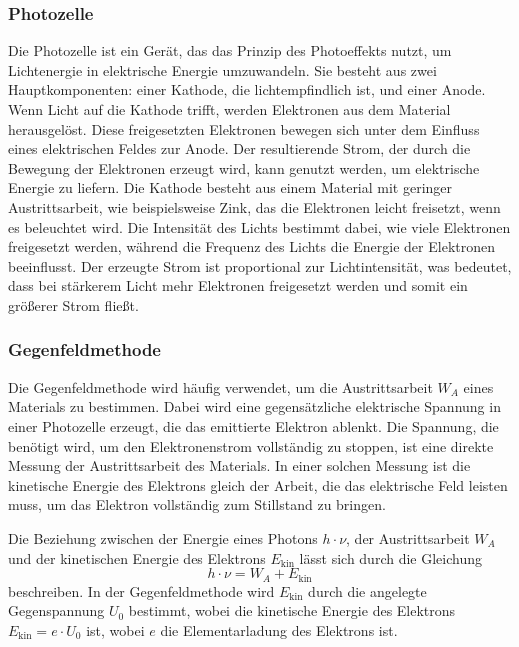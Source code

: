 \documentclass{article}
\begin{document}
    \subsubsection{Photozelle}
    Die Photozelle ist ein Gerät, das das Prinzip des Photoeffekts nutzt, um Lichtenergie in 
    elektrische Energie umzuwandeln. Sie besteht aus zwei Hauptkomponenten: einer Kathode, 
    die lichtempfindlich ist, und einer Anode. Wenn Licht auf die Kathode trifft, werden 
    Elektronen aus dem Material herausgelöst. Diese freigesetzten Elektronen bewegen sich 
    unter dem Einfluss eines elektrischen Feldes zur Anode. Der resultierende Strom, der durch 
    die Bewegung der Elektronen erzeugt wird, kann genutzt werden, um elektrische Energie zu 
    liefern. Die Kathode besteht aus einem Material mit geringer Austrittsarbeit, wie 
    beispielsweise Zink, das die Elektronen leicht freisetzt, wenn es beleuchtet wird. Die 
    Intensität des Lichts bestimmt dabei, wie viele Elektronen freigesetzt werden, während 
    die Frequenz des Lichts die Energie der Elektronen beeinflusst. Der erzeugte Strom ist proportional zur Lichtintensität, was 
    bedeutet, dass bei stärkerem Licht mehr Elektronen freigesetzt werden und somit ein 
    größerer Strom fließt.


    \subsubsection{Gegenfeldmethode}
    Die Gegenfeldmethode wird häufig verwendet, um die Austrittsarbeit \( W_A \) eines Materials 
    zu bestimmen. Dabei wird eine gegensätzliche elektrische Spannung in einer Photozelle erzeugt,
     die das emittierte Elektron ablenkt. Die Spannung, die benötigt wird, um den Elektronenstrom
      vollständig zu stoppen, ist eine direkte Messung der Austrittsarbeit des Materials. In 
      einer solchen Messung ist die kinetische Energie des Elektrons gleich der Arbeit, die das
       elektrische Feld leisten muss, um das Elektron vollständig zum Stillstand zu bringen.

Die Beziehung zwischen der Energie eines Photons \( h \cdot \nu \), der Austrittsarbeit \( W_A \) 
und der kinetischen Energie des Elektrons \( E_{\text{kin}} \) lässt sich durch die Gleichung 
\[
h \cdot \nu = W_A + E_{\text{kin}}
\]
beschreiben. In der Gegenfeldmethode wird \( E_{\text{kin}} \) durch die angelegte Gegenspannung
 \( U_0 \) bestimmt, wobei die kinetische Energie des Elektrons \( E_{\text{kin}} = e \cdot U_0 \)
  ist, wobei \( e \) die Elementarladung des Elektrons ist.
\end{document}
